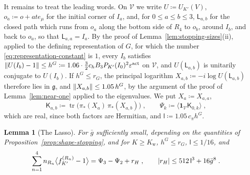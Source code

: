 \documentclass[11pt]{preprint}
\newcommand{\tr}{\operatorname{tr}}
\DeclarePairedDelimiter{\abs}{\lvert}{\rvert}
\DeclarePairedDelimiter{\norm}{\lVert}{\rVert}
\numberwithin{equation}{section}
\newtheorem{lemma}[theorem]{Lemma}
\theoremstyle{definition}
\theoremstyle{remark}
\theoremstyle{plain}
\begin{document}
It remains to treat the leading words. On $\mathcal V$ we write $U \coloneqq U_{K'}(V)$, $o_a \coloneqq o + ate_\mu$ for the initial corner of $I_a$, and, for $0 \leq a \leq b \leq 3$, $\mathsf L_{a,b}$ for the closed path which runs from $o_a$ along the bottom side of $R_4$ to $o_b$, around $I_b$, and back to $o_a$, so that $\mathsf L_{a,a} = I_a$. By the proof of Lemma~\ref{lem:stopping-sizes}(ii), applied to the defining representation of $G$, for which the number \eqref{eq:representation-constant} is $1$, every $I_b$ satisfies $\norm{U(I_b) - 1} \leq h^G \coloneqq 1.06 \cdot \frac32c_hB_3P_{K'}(I_0)^2\varepsilon^{\mathrm{act}}$ on $\mathcal V$, and $U(\mathsf L_{a,b})$ is unitarily conjugate to $U(I_b)$. If $h^G \leq r_G$, the principal logarithm $X_{a,b} \coloneqq -i\log U(\mathsf L_{a,b})$ therefore lies in $\mathfrak g$, and $\norm{X_{a,b}} \leq 1.05\,h^G$, by the argument of the proof of Lemma~\ref{lem:near-one} applied to the eigenvalues. We put $X_a \coloneqq X_{a,a}$,
\begin{equation}\label{eq:flux-moments}
    \mathsf K_{a,b} \coloneqq \tr\bigl(\pi_*(X_a)\,\pi_*(X_{a,b})\bigr)\;,
    \qquad
    \Psi_k \coloneqq \bigl\langle\mathbf 1_{\mathcal V}\mathsf K_{0,k}\bigr\rangle\;,
\end{equation}
which are real, since both factors are Hermitian, and $\mathsf l \coloneqq 1.05\,c_\pi h^G$.

\begin{lemma}[The Lasso]\label{lem:lasso}
For $\bar g$ sufficiently small, depending on the quantities of Proposition~\ref{prop:shape-stopping}, and for $K \geq K_{\mathrm w}$, $h^G \leq r_G$, $\mathsf l \leq 1/16$, and
\begin{equation}\label{eq:lasso}
    \sum_{n=1}^{4}n_{R_n}\bigl\langle f^{(R_n)}_{K'} - 1\bigr\rangle = \Psi_3 - \Psi_2 + r_H\;,
    \qquad
    \abs{r_H} \leq 512\,\mathsf l^3 + 16\bar g^8\;.
\end{equation}
\end{lemma}
\end{document}
